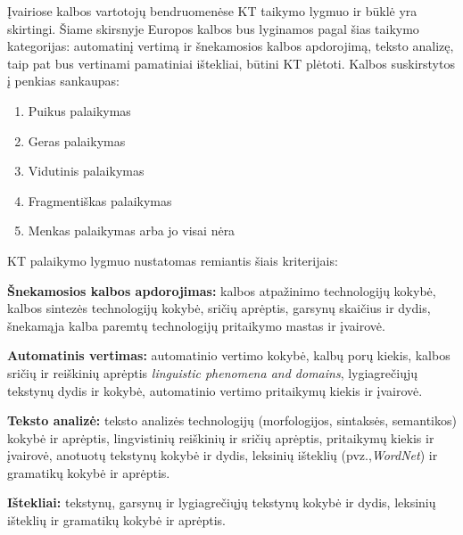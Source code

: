 \documentclass[]{../metanetpaper}
\begin{document}
\begin{multicols}{2}
 Įvairiose kalbos vartotojų bendruomenėse KT taikymo lygmuo ir būklė yra skirtingi. Šiame skirsnyje Europos kalbos bus lyginamos pagal šias taikymo kategorijas: automatinį vertimą ir šnekamosios kalbos apdorojimą, teksto analizę, taip pat bus vertinami pamatiniai ištekliai, būtini KT plėtoti. Kalbos suskirstytos į penkias sankaupas:

\begin{enumerate}
\item Puikus palaikymas
\item Geras palaikymas
\item Vidutinis palaikymas
\item Fragmentiškas palaikymas
\item Menkas palaikymas arba jo visai nėra
\end{enumerate}

KT palaikymo lygmuo nustatomas remiantis šiais kriterijais:

\textbf{Šnekamosios kalbos apdorojimas:} kalbos atpažinimo technologijų kokybė, kalbos sintezės technologijų kokybė, sričių aprėptis, garsynų skaičius ir dydis, šnekamąja kalba paremtų technologijų pritaikymo mastas ir įvairovė.

\textbf{Automatinis vertimas:} automatinio vertimo kokybė, kalbų porų kiekis, kalbos sričių ir reiškinių aprėptis \textit{linguistic phenomena and domains}, lygiagrečiųjų tekstynų dydis ir kokybė, automatinio vertimo pritaikymų kiekis ir įvairovė.

\textbf{Teksto analizė:} teksto analizės technologijų (morfologijos, sintaksės, semantikos) kokybė ir aprėptis, lingvistinių reiškinių ir sričių aprėptis, pritaikymų kiekis ir įvairovė, anotuotų tekstynų kokybė ir dydis, leksinių išteklių (pvz.,\textit{WordNet}) ir gramatikų kokybė ir aprėptis.

\textbf{Ištekliai:} tekstynų, garsynų ir lygiagrečiųjų tekstynų kokybė ir dydis, leksinių išteklių ir gramatikų kokybė ir aprėptis.


\end{multicols}
\end{document}
